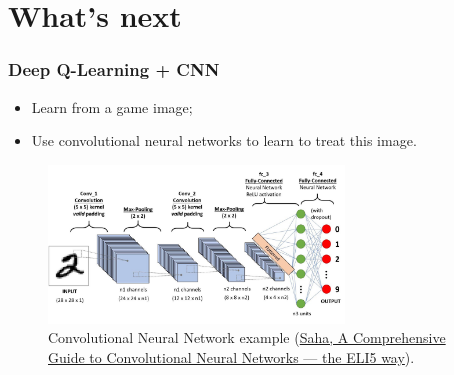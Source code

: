 \documentclass{beamer}
\begin{document}
    \section{What's next}

        \begin{frame}
            \frametitle{Deep Q-Learning + CNN}
        
            \begin{itemize}
                \item Learn from a game image;
                \item Use convolutional neural networks to learn to treat this image.
            \end{itemize}

            \begin{figure}[]
                \centering
                \includegraphics[width=0.7\textwidth]{figures/cnn}
                \caption{Convolutional Neural Network example (\href{https://towardsdatascience.com/a-comprehensive-guide-to-convolutional-neural-networks-the-eli5-way-3bd2b1164a53}{Saha, A Comprehensive Guide to Convolutional Neural Networks — the ELI5 way}).}
                \label{fig11:cnn}
            \end{figure}
        
        \end{frame}
\end{document}
